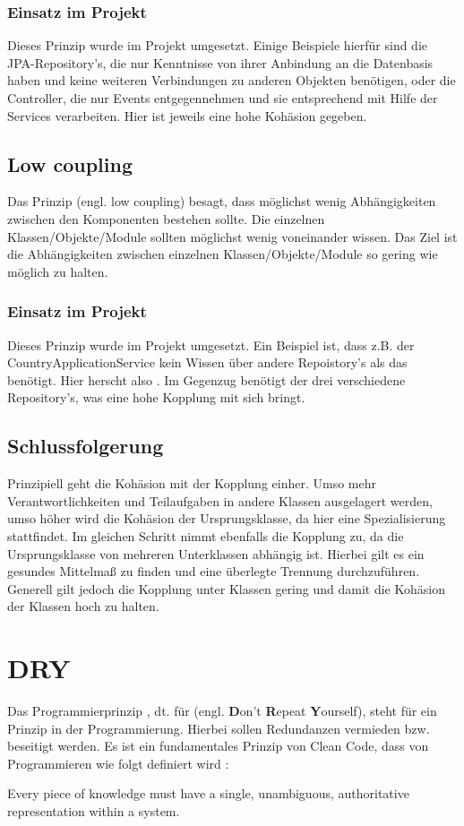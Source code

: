 				\subsubsection{Einsatz im Projekt}
				Dieses Prinzip wurde im Projekt umgesetzt. Einige Beispiele hierfür sind die JPA-Repository's, die nur Kenntnisse von ihrer Anbindung an die Datenbasis haben und keine weiteren Verbindungen zu anderen Objekten benötigen, oder die Controller, die nur Events entgegennehmen und sie entsprechend mit Hilfe der Services verarbeiten. Hier ist jeweils eine hohe Kohäsion gegeben.
			
			\subsection{Low coupling \cite{kohaesion.google}} \label{3.lowCoupling}
			Das Prinzip  (engl. low coupling) besagt, dass möglichst wenig Abhängigkeiten zwischen den Komponenten bestehen sollte. Die einzelnen Klassen/Objekte/Module sollten möglichst wenig voneinander wissen. Das Ziel ist die Abhängigkeiten zwischen einzelnen Klassen/Objekte/Module so gering wie möglich zu halten.
				\subsubsection{Einsatz im Projekt}
				Dieses Prinzip wurde im Projekt umgesetzt. Ein Beispiel ist, dass z.B. der CountryApplicationService kein Wissen über andere Repoistory's als das  benötigt. Hier herscht also . Im Gegenzug benötigt der  drei verschiedene Repository's, was eine hohe Kopplung mit sich bringt.
			
		\subsection{Schlussfolgerung}
		Prinzipiell geht die Kohäsion mit der Kopplung einher. Umso mehr Verantwortlichkeiten und Teilaufgaben in andere Klassen ausgelagert werden, umso höher wird die Kohäsion der Ursprungsklasse, da hier eine Spezialisierung stattfindet. Im gleichen Schritt nimmt ebenfalls die Kopplung zu, da die Ursprungsklasse von mehreren Unterklassen abhängig ist. Hierbei gilt es ein gesundes Mittelmaß zu finden und eine überlegte Trennung durchzuführen. Generell gilt jedoch die Kopplung unter Klassen gering und damit die Kohäsion der Klassen hoch zu halten.
		
	\section{DRY}
	Das Programmierprinzip , dt. für  (engl. \textbf{D}on't \textbf{R}epeat \textbf{Y}ourself), steht für ein Prinzip in der Programmierung. Hierbei sollen Redundanzen vermieden bzw. beseitigt werden. Es ist ein fundamentales Prinzip von Clean Code, dass von Programmieren wie folgt definiert wird :
	\par Every piece of knowledge must have a single, unambiguous, authoritative representation within a system. \cite{dry.thevaluable}
	\\
